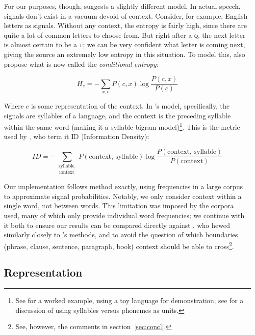 \documentclass[12pt,twoside]{article}
\begin{document}
For our purposes, though, \citet{oh} suggests a slightly different model. In actual speech, signals don't exist in a vacuum devoid of context. Consider, for example, English letters as signals. Without any context, the entropy is fairly high, since there are quite a lot of common letters to choose from. But right after a \textsc{q}, the next letter is almost certain to be a \textsc{u}; we can be very confident what letter is coming next, giving the source an extremely low entropy in this situation. To model this, \citet[52]{shannon} also propose what is now called the \emph{conditional entropy}:

\begin{equation}
H_c = - \sum_{x,c} P(c,x) \log \frac{P(c,x)}{P(c)}
\end{equation}

Where \(c\) is some representation of the context. In \citeauthor{oh}'s model, specifically, the signals are syllables of a language, and the context is the preceding syllable within the same word (making it a syllable bigram model)\footnote{See \cite[41]{oh} for a worked example, using a toy language for demonstration; see \cite[545]{pellegrino} for a discussion of using syllables versus phonemes as units.}. This is the metric used by \citet{coupé}, who term it ID (Information Density):

\begin{equation}
\label{eq:id}
ID = - \sum_{\substack{\textrm{syllable},\\\textrm{context}}} P(\textrm{context, syllable}) \log \frac{P(\textrm{context, syllable})}{P(\textrm{context})}
\end{equation}

Our implementation follows  method exactly, using frequencies in a large corpus to approximate signal probabilities. Notably, we only consider context within a single word, not between words. This limitation was imposed by the corpora \citeauthor{oh} used, many of which only provide individual word frequencies; we continue with it both to ensure our results can be compared directly against , who hewed similarly closely to \citeauthor{oh}'s methods, and to avoid the question of which boundaries (phrase, clause, sentence, paragraph, book) context should be able to cross\footnote{See, however, the comments in section~\ref{sec:concl}.}.

\subsection{Representation}
\label{subsec:repr}
\end{document}
